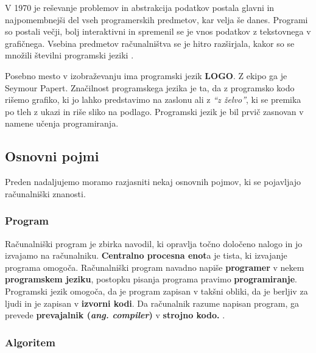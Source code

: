 V 1970 je reševanje problemov in abstrakcija podatkov postala glavni
in najpomembnejši del vseh programerskih predmetov, kar velja še
danes.  Programi so postali večji, bolj interaktivni in spremenil se
je vnos podatkov z tekstovnega v grafičnega. Vsebina predmetov
računalništva se je hitro razširjala, kakor so se množili številni
programski jeziki \cite{thesisAWebP}.

Posebno mesto v izobraževanju ima programski jezik
\textbf{LOGO}. Z ekipo ga je Seymour Papert. Značilnost programskega
jezika je ta, da z programsko kodo rišemo grafiko, ki jo lahko
predstavimo na zaslonu ali z \emph{``z želvo''}, ki se premika po tleh
z ukazi in riše sliko na podlago. Programski jezik je bil prvič
zasnovan v namene učenja programiranja.



\subsection{Osnovni pojmi}
\label{sec:kaj_je_programiranje}


Preden nadaljujemo moramo razjasniti nekaj osnovnih pojmov, ki se
pojavljajo računalniški znanosti.

\subsubsection{Program}
\label{sec:program}

Računalniški program je zbirka navodil, ki opravlja točno določeno
nalogo in jo izvajamo na računalniku. \textbf{Centralno procesna
  enot}a je tista, ki izvajanje programa omogoča. Računalniški program
navadno napiše \textbf{programer} v nekem \textbf{programskem jeziku},
postopku pisanja programa pravimo \textbf{programiranje}. Programski
jezik omogoča, da je program zapisan v takšni obliki, da je berljiv za
ljudi in je zapisan v \textbf{izvorni kodi}. Da računalnik razume
napisan program, ga prevede \textbf{prevajalnik
  (\emph{ang. compiler})} v \textbf{strojno kodo.}
\cite{wiki:computer_program}.

\subsubsection{Algoritem}
\label{sec:algoritem}

